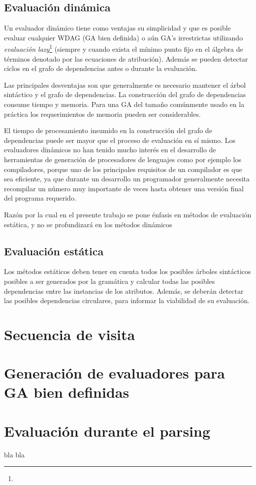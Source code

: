 \subsection{Evaluación dinámica}

Un evaluador dinámico tiene como ventajas su simplicidad y que es posible evaluar cualquier WDAG (GA bien definida) o aún GA’s irrestrictas utilizando \textit{evaluación lazy}\footnote{} (siempre y cuando exista el mínimo punto fijo en el álgebra de términos denotado por las ecuaciones de atribución). Además se pueden detectar ciclos en el grafo de dependencias antes o durante la evaluación.

Las principales desventajas son que generalmente es necesario mantener el árbol sintáctico y el grafo de dependencias. La construcción del grafo de dependencias consume tiempo y memoria. Para una GA del tamaño comúnmente usado en la práctica los requerimientos de memoria pueden ser considerables.

El tiempo de procesamiento insumido en la construcción del grafo de dependencias puede ser mayor que el proceso de evaluación en sí mismo. Los evaluadores dinámicos no han tenido mucho interés en el desarrollo de herramientas de generación de procesadores de lenguajes como por ejemplo los compiladores, porque uno de los principales requisitos de un compilador es que sea eficiente, ya que durante un desarrollo un programador generalmente necesita recompilar un número muy importante de veces hasta obtener una versión final del programa requerido.

Razón por la cual en el presente trabajo se pone énfasis en métodos de evaluación estática, y no se profundizará en los métodos dinámicos

\subsection{Evaluación estática}
Los métodos estáticos deben tener en cuenta todos los posibles árboles sintácticos posibles a ser generados por la gramática y calcular todas las posibles dependencias entre las instancias de los atributos. Además, se deberán detectar las posibles dependencias circulares, para informar la viabilidad de su evaluación.

\section{Secuencia de visita}
\section{Generación de evaluadores para GA bien definidas}
\section{Evaluación durante el parsing}

bla bla

